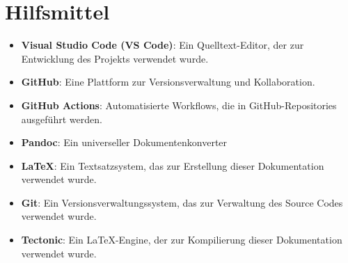 \section*{Hilfsmittel}
\begin{itemize}
    \item \textbf{Visual Studio Code (VS Code)}: Ein Quelltext-Editor, der zur Entwicklung des Projekts verwendet wurde.
    \item \textbf{GitHub}: Eine Plattform zur Versionsverwaltung und Kollaboration.
    \item \textbf{GitHub Actions}: Automatisierte Workflows, die in GitHub-Repositories ausgeführt werden.
    \item \textbf{Pandoc}: Ein universeller Dokumentenkonverter
    \item \textbf{LaTeX}: Ein Textsatzsystem, das zur Erstellung dieser Dokumentation verwendet wurde.
    \item \textbf{Git}: Ein Versionsverwaltungssystem, das zur Verwaltung des Source Codes verwendet wurde.
    \item \textbf{Tectonic}: Ein LaTeX-Engine, der zur Kompilierung dieser Dokumentation verwendet wurde.
\end{itemize}